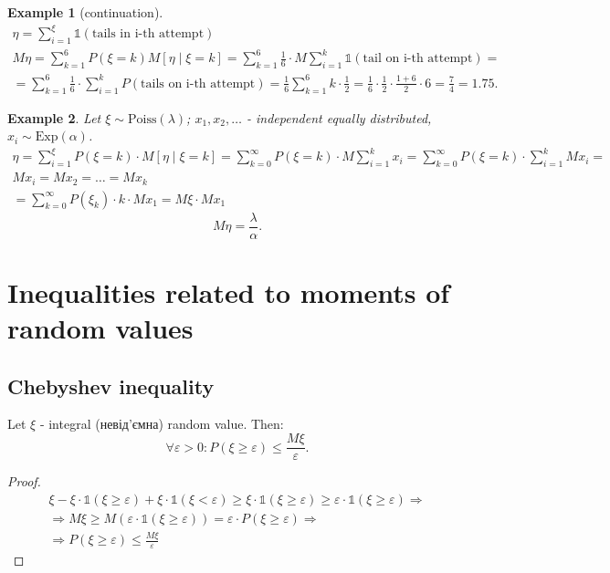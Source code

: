 \documentclass[12pt,letterpaper]{report}
\newtheorem*{example}{Example}
\begin{document}
\begin{example}[continuation]
    \begin{gather*}
        \eta = \sum_{i=1}^{\xi} \mathds{1}(\text{tails in i-th attempt}) \\
        M\eta = \sum_{k=1}^{6} P(\xi=k) M[\eta \mid \xi = k] =
        \sum_{k=1}^{6}\frac{1}{6} \cdot M\sum_{i=1}^{k} \mathds{1}(\text{tail on i-th attempt}) = \\
        = \sum_{k=1}^{6} \frac{1}{6} \cdot \sum_{i=1}^{k}  P(\text{tails on i-th attempt}) = 
        \frac{1}{6}\sum_{k=1}^{6} k \cdot \frac{1}{2} = \frac{1}{6} \cdot \frac{1}{2} \cdot \frac{1+6}{2} \cdot 6 = \frac{7}{4} = 1.75.
    \end{gather*}
\end{example}

\begin{example}
    Let $\xi \sim \text{Poiss}(\lambda)$; $x_1, x_2, \dots$ - independent equally distributed,
    $x_i \sim \text{Exp}(\alpha)$.
    \begin{gather*}
        \eta = \sum_{i=1}^{\xi} P(\xi=k) \cdot M[\eta \mid \xi = k] =
        \sum_{k=0}^{\infty} P(\xi=k)\cdot M\sum_{i=1}^{k} x_i =
        \sum_{k=0}^{\infty} P(\xi=k) \cdot \sum_{i=1}^{k}Mx_i = \\
        Mx_i = Mx_2 = \dots = Mx_k \\
        = \sum_{k=0}^{\infty}P(\xi_k) \cdot k \cdot Mx_1 = M\xi \cdot Mx_1
    \end{gather*}
    \[
    M\eta = \frac{\lambda}{\alpha}
    .\] 
\end{example}

\section{Inequalities related to moments of random values}
\subsection{Chebyshev inequality}

Let $\xi$ - integral (невід'ємна) random value. Then:
\[
    \forall \varepsilon > 0 : P(\xi \geq \varepsilon) \leq \frac{M\xi}{\varepsilon}
.\] 
\begin{proof}
    \begin{gather*}
        \xi - \xi \cdot \mathds{1}(\xi \geq \varepsilon) + \xi \cdot \mathds{1}(\xi < \varepsilon) \geq
        \xi \cdot \mathds{1} (\xi \geq \varepsilon) \geq \varepsilon \cdot \mathds{1}(\xi \geq \varepsilon) \Rightarrow \\
        \Rightarrow M\xi \geq M(\varepsilon \cdot \mathds{1}(\xi \geq \varepsilon)) =
        \varepsilon \cdot P(\xi \geq \varepsilon) \Rightarrow \\
        \Rightarrow P(\xi \geq \varepsilon) \leq \frac{M\xi}{\varepsilon}
    \end{gather*}
\end{proof}
\end{document}
